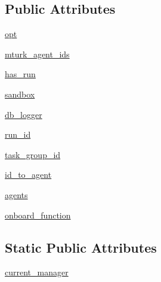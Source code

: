 \subsection*{Public Attributes}
\begin{DoxyCompactItemize}
\item 
\hyperlink{classparlai_1_1mturk_1_1webapp_1_1run__mocks_1_1mock__turk__manager_1_1MockTurkManager_aac112e5b6007f3564a3e9b259aac2e83}{opt}
\item 
\hyperlink{classparlai_1_1mturk_1_1webapp_1_1run__mocks_1_1mock__turk__manager_1_1MockTurkManager_a2226080faa905349680dbbdb69950c8f}{mturk\+\_\+agent\+\_\+ids}
\item 
\hyperlink{classparlai_1_1mturk_1_1webapp_1_1run__mocks_1_1mock__turk__manager_1_1MockTurkManager_af9f0b5f4b171c54b67bbe080598be616}{has\+\_\+run}
\item 
\hyperlink{classparlai_1_1mturk_1_1webapp_1_1run__mocks_1_1mock__turk__manager_1_1MockTurkManager_afdb63edc97657e2f02c683da1d08b991}{sandbox}
\item 
\hyperlink{classparlai_1_1mturk_1_1webapp_1_1run__mocks_1_1mock__turk__manager_1_1MockTurkManager_a02449f23749f4323d833ea3c2754a12e}{db\+\_\+logger}
\item 
\hyperlink{classparlai_1_1mturk_1_1webapp_1_1run__mocks_1_1mock__turk__manager_1_1MockTurkManager_aabdd930671f624dded8d99b9a421f186}{run\+\_\+id}
\item 
\hyperlink{classparlai_1_1mturk_1_1webapp_1_1run__mocks_1_1mock__turk__manager_1_1MockTurkManager_ae406c6e27ee8b8880963f850b39656bd}{task\+\_\+group\+\_\+id}
\item 
\hyperlink{classparlai_1_1mturk_1_1webapp_1_1run__mocks_1_1mock__turk__manager_1_1MockTurkManager_a9a5d99225ec276123e9a9fbe7e13cf5e}{id\+\_\+to\+\_\+agent}
\item 
\hyperlink{classparlai_1_1mturk_1_1webapp_1_1run__mocks_1_1mock__turk__manager_1_1MockTurkManager_a31afd85428c9d5a26fa1863247d57a87}{agents}
\item 
\hyperlink{classparlai_1_1mturk_1_1webapp_1_1run__mocks_1_1mock__turk__manager_1_1MockTurkManager_a10f2ca04ba1557f54eec4e04cfe92ddd}{onboard\+\_\+function}
\end{DoxyCompactItemize}
\subsection*{Static Public Attributes}
\begin{DoxyCompactItemize}
\item 
\hyperlink{classparlai_1_1mturk_1_1webapp_1_1run__mocks_1_1mock__turk__manager_1_1MockTurkManager_a8bf6a8b1ddba600cd2dc5ccc333875ea}{current\+\_\+manager}
\end{DoxyCompactItemize}


